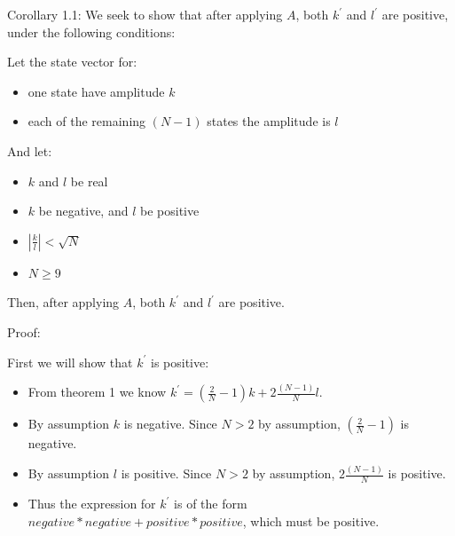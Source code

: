 \documentclass[]{article}
\begin{document}
Corollary 1.1: We seek to show that after applying $A$, both $k^{'}$
and $l^{'}$ are positive, under the following conditions:

Let the state vector for:
\begin{itemize}
\item one state have amplitude $k$
\item each of the remaining $(N-1)$ states the amplitude is $l$
\end{itemize}
And let:
\begin{itemize}
\item $k$ and $l$ be real
\item $k$ be negative, and $l$ be positive
\item $\left|\frac{k}{l}\right| < \sqrt{N}$
\item $N \ge 9$
\end{itemize}
Then, after applying $A$, both $k^{'}$ and $l^{'}$ are positive.

Proof: 

First we will show that $k^{'}$ is positive:
\begin{itemize}

\item From theorem 1 we know $k^{'} = \left(\frac{2}{N} - 1 \right)k + 2\frac{(N-1)}{N}l$.  

\item By assumption $k$ is negative. Since $N > 2$ by assumption, $\left(\frac{2}{N} - 1 \right)$ is negative.

\item By assumption $l$ is positive.  Since $N > 2$ by assumption, $2\frac{(N-1)}{N}$ is positive.

\item Thus the expression for $k^{'}$ is of the form $negative*negative + positive*positive$, which must be positive.
\end{itemize}
\end{document}
